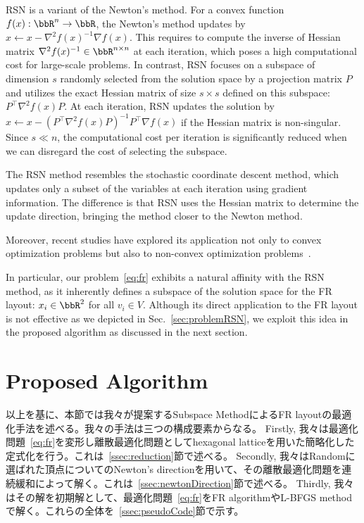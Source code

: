 \documentclass[dvipdfmx,journal]{IEEEtran}
\begin{document}
RSN is a variant of the Newton's method. For a convex function $f(x): \bbR^n \to \bbR$, the Newton's method updates by $x \gets x - \nabla^2 f(x)^{-1} \nabla f(x)$.
This requires to compute the inverse of Hessian matrix $\nabla^2 f(x)^{-1} \in \bbR^{n \times n}$ at each iteration, which poses a high computational cost for large-scale problems.
In contrast, RSN focuses on a subspace of dimension $s$ randomly selected from the solution space by a projection matrix $P$ and utilizes the exact Hessian matrix of size $s \times s$ defined on this subspace: $P^\top \nabla^2 f(x) P$.
At each iteration, RSN updates the solution by $x \gets x - (P^\top \nabla^2 f(x) P)^{-1} P^\top \nabla f(x)$ if the Hessian matrix is non-singular.
Since $s \ll n$, the computational cost per iteration is significantly reduced when we can disregard the cost of selecting the subspace.

The RSN method resembles the stochastic coordinate descent method, which updates only a subset of the variables at each iteration using gradient information.
The difference is that RSN uses the Hessian matrix to determine the update direction, bringing the method closer to the Newton method.

Moreover, recent studies have explored its application not only to convex optimization problems but also to non-convex optimization problems~\cite{fujiRandomizedSubspaceRegularized2022}.

In particular, our problem~\eqref{eq:fr} exhibits a natural affinity with the RSN method, as it inherently defines a subspace of the solution space for the FR layout: $x_i \in \bbR^2$ for all $v_i \in V$.
Although its direct application to the FR layout is not effective as we depicted in Sec.~\ref{sec:problemRSN}, we exploit this idea in the proposed algorithm as discussed in the next section.

\section{Proposed Algorithm}\label{sec:algorithm}

以上を基に、本節では我々が提案するSubspace MethodによるFR layoutの最適化手法を述べる。我々の手法は三つの構成要素からなる。
Firstly, 我々は最適化問題~\eqref{eq:fr}を変形し離散最適化問題としてhexagonal latticeを用いた簡略化した定式化を行う。これは~\ref{ssec:reduction}節で述べる。
Secondly, 我々はRandomに選ばれた頂点についてのNewton's directionを用いて、その離散最適化問題を連続緩和によって解く。これは~\ref{ssec:newtonDirection}節で述べる。
Thirdly, 我々はその解を初期解として、最適化問題~\eqref{eq:fr}をFR algorithmやL-BFGS methodで解く。これらの全体を~\ref{ssec:pseudoCode}節で示す。
\end{document}
